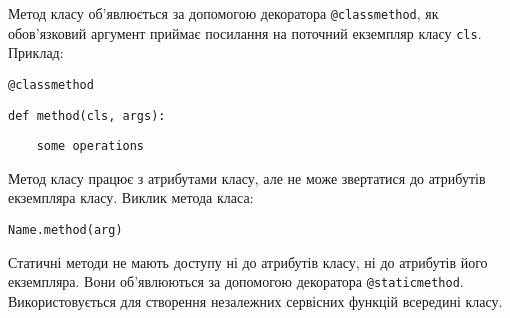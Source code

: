 \begin{frame}
Метод класу об'явлюється за допомогою декоратора \texttt{@classmethod}, як обов'язковий аргумент приймає посилання на поточний екземпляр класу \texttt{cls}. Приклад:

\texttt{@classmethod}

\texttt{def method(cls, args):}

\texttt{~~~~some operations}

Метод класу працює з атрибутами класу, але не може звертатися до атрибутів екземпляра класу. Виклик метода класа:

\texttt{Name.method(arg)}
\end{frame}

\begin{frame}
Статичні методи не мають доступу ні до атрибутів класу, ні до атрибутів його екземпляра. Вони об'явлюються за допомогою декоратора \texttt{@staticmethod}. Використовується для створення незалежних сервісних функцій всередині класу.  
\end{frame}
